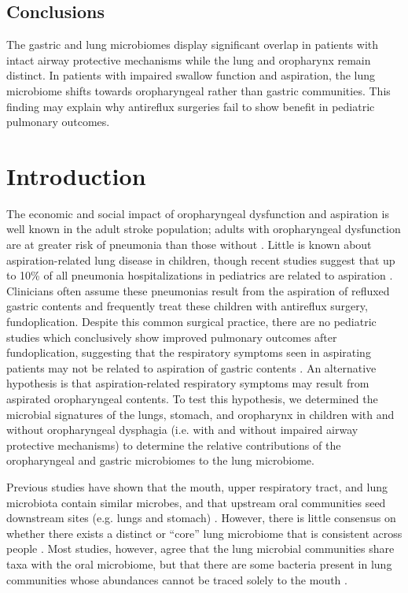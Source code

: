 \subsection*{Conclusions}

The gastric and lung microbiomes display significant overlap in patients with intact airway protective mechanisms while the lung and oropharynx remain distinct.
In patients with impaired swallow function and aspiration, the lung microbiome shifts towards oropharyngeal rather than gastric communities.
This finding may explain why antireflux surgeries fail to show benefit in pediatric pulmonary outcomes.

\newpage
\section{Introduction}

The economic and social impact of oropharyngeal dysfunction and aspiration is well known in the adult stroke population; adults with oropharyngeal dysfunction are at greater risk of pneumonia than those without \cite{holas1994aspcomplications}.
Little is known about aspiration-related lung disease in children, though recent studies suggest that up to 10\% of all pneumonia hospitalizations in pediatrics are related to aspiration \cite{thomson2016asppneumo}.
Clinicians often assume these pneumonias result from the aspiration of refluxed gastric contents and frequently treat these children with antireflux surgery, fundoplication.
Despite this common surgical practice, there are no pediatric studies which conclusively show improved pulmonary outcomes after fundoplication, suggesting that the respiratory symptoms seen in aspirating patients may not be related to aspiration of gastric contents \cite{barnhart2013fundo,lee2008fundo,goldin2006fundo,yeh2016,srivastava2009fundo}.
An alternative hypothesis is that aspiration-related respiratory symptoms may result from aspirated oropharyngeal contents.
To test this hypothesis, we determined the microbial signatures of the lungs, stomach, and oropharynx in children with and without oropharyngeal dysphagia (i.e. with and without impaired airway protective mechanisms) to determine the relative contributions of the oropharyngeal and gastric microbiomes to the lung microbiome.

Previous studies have shown that the mouth, upper respiratory tract, and lung microbiota contain similar microbes, and that upstream oral communities seed downstream sites (e.g. lungs and stomach) \cite{Bassis2015source,Charlson2011topographical,rosen2015ppi}.
However, there is little consensus on whether there exists a distinct or ``core'' lung microbiome that is consistent across people \cite{Charlson2011topographical,venkataraman-2015-dispersal,segal-2013-pneumotypes,erbDownward-2011-COPD}.
Most studies, however, agree that the lung microbial communities share taxa with the oral microbiome, but that there are some bacteria present in lung communities whose abundances cannot be traced solely to the mouth \cite{Bassis2015source,Charlson2011topographical,morris-2013-healthsmokers,segal-2013-pneumotypes}.

